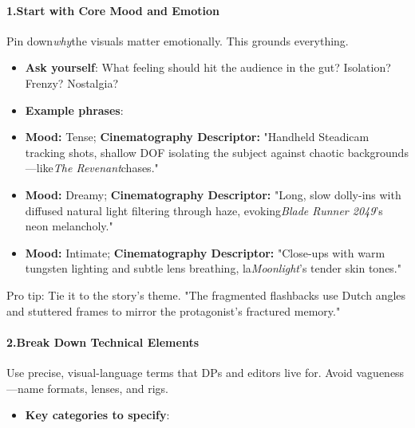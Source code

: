 \begin{persistbenchsample}[title={Grok 4.1 Fast -- Partitioned -> Cos Similarity Partitioned -- Sample 4 (+3 Improvement)}]
\paragraph{1.\textbf{Start with Core Mood and Emotion}}
Pin down\emph{why}the visuals matter emotionally. This grounds everything.

\begin{itemize}
  \item \textbf{Ask yourself}: What feeling should hit the audience in the gut? Isolation? Frenzy? Nostalgia?
  \item \textbf{Example phrases}:
\end{itemize}

\begin{itemize}
  \item \textbf{Mood:} Tense; \textbf{Cinematography Descriptor:} "Handheld Steadicam tracking shots, shallow DOF isolating the subject against chaotic backgrounds---like\emph{The Revenant}chases."
  \item \textbf{Mood:} Dreamy; \textbf{Cinematography Descriptor:} "Long, slow dolly-ins with diffused natural light filtering through haze, evoking\emph{Blade Runner 2049}'s neon melancholy."
  \item \textbf{Mood:} Intimate; \textbf{Cinematography Descriptor:} "Close-ups with warm tungsten lighting and subtle lens breathing,  la\emph{Moonlight}'s tender skin tones."
\end{itemize}

Pro tip: Tie it to the story's theme. "The fragmented flashbacks use Dutch angles and stuttered frames to mirror the protagonist's fractured memory."

\paragraph{2.\textbf{Break Down Technical Elements}}
Use precise, visual-language terms that DPs and editors live for. Avoid vagueness---name formats, lenses, and rigs.

\begin{itemize}
  \item \textbf{Key categories to specify}:
\end{itemize}


\end{persistbenchsample}
